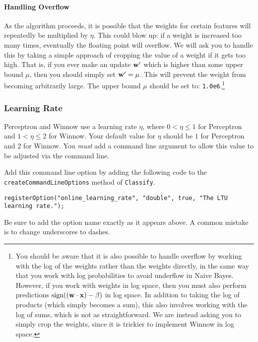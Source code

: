 \documentclass[11pt]{article}
\newcommand{\vw}{{\bf w}}
\newcommand{\vx}{{\bf x}}
\newcommand{\code}[1]{{\footnotesize \tt #1}}
\begin{document}
\paragraph{Handling Overflow} As the algorithm proceeds, it is possible that the weights for certain features will repeatedly be multiplied by $\eta$. This could blow up: if a weight is increased too many times, eventually the floating point will overflow. 
We will ask you to handle this by taking a simple approach of cropping the value of a weight if it gets too high. That is, if you ever make an update $\vw'$ which is higher than some upper bound $\mu$, then you should simply set $\vw' = \mu$. This will prevent the weight from becoming arbitrarily large. The upper bound $\mu$ should be set to: \code{1.0e6}.\footnote{You should be aware that it is also possible to handle overflow by working with the log of the weights rather than the weights directly, in the same way that you work with log probabilities to avoid underflow in Naive Bayes. However, if you work with weights in log space, then you must also perform predictions $\textrm{sign}((\vw \cdot \vx) - \beta)$ in log space. In addition to taking the log of products (which simply becomes a sum), this also involves working with the log of sums, which is not as straightforward. We are instead asking you to simply crop the weights, since it is trickier to implement Winnow in log space.}

\subsubsection{Learning Rate}
Perceptron and Winnow use a learning rate $\eta$, where  $0 < \eta \leq 1$ for Perceptron and $1 < \eta \leq 2$ for Winnow.  Your default value for $\eta$ should be $1$ for Perceptron and $2$ for Winnow. You \emph{must} add a command line argument to allow this value to be adjusted via the command line. 

Add this command line option by adding the following code to the \code{createCommandLineOptions} method of \code{Classify}.
\begin{footnotesize}
\begin{verbatim}
registerOption("online_learning_rate", "double", true, "The LTU learning rate.");
\end{verbatim}
\end{footnotesize}

Be sure to add the option name exactly as it appears above. A common mistake is to change underscores to dashes.
\end{document}
